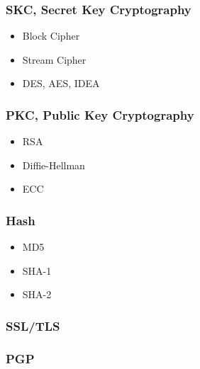 \begin{frame}
    \frametitle{SKC, Secret Key Cryptography}
    \begin{itemize}
        \item Block Cipher
        \item Stream Cipher
        \item DES, AES, IDEA
    \end{itemize}
\end{frame}

\begin{frame}
    \frametitle{PKC, Public Key Cryptography}
    \begin{itemize}
        \item RSA
        \item Diffie-Hellman
        \item ECC
    \end{itemize}
\end{frame}

\begin{frame}
    \frametitle{Hash}
    \begin{itemize}
        \item MD5
        \item SHA-1
        \item SHA-2
    \end{itemize}
\end{frame}

\begin{frame}
    \frametitle{SSL/TLS}
\end{frame}

\begin{frame}
    \frametitle{PGP}
\end{frame}




